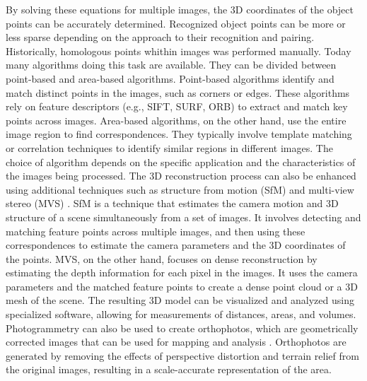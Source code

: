 \documentclass[12pt,a4paper,oneside]{report}
\begin{document}
By solving these equations for multiple images, the 3D coordinates of the object 
points can be accurately determined.
Recognized object points can be more or less sparse depending on the approach to 
their recognition and pairing. 
Historically, homologous points whithin images was
performed manually. Today many algorithms doing this task are available. 
They can be divided between point-based and area-based algorithms.
Point-based algorithms identify and match distinct points in the images, such as
corners or edges. These algorithms rely on feature descriptors (e.g., SIFT, SURF, ORB)
\cite{loweDistinctiveImageFeatures2004,baySpeededUpRobustFeatures2008,rubleeORBEfficientAlternative2011}
to extract and match key points across images. Area-based algorithms, on the other hand,
use the entire image region to find correspondences. They typically involve
template matching or correlation techniques to identify similar regions in different images.
The choice of algorithm depends on the specific application and the characteristics
of the images being processed.
The 3D reconstruction process can also be enhanced using additional techniques such as
structure from motion (SfM) and multi-view stereo (MVS)
\cite{westobyStructurefromMotionPhotogrammetryLowcost2012,seitzComparisonEvaluationMultiView2006}. 
SfM is a technique that
estimates the camera motion and 3D structure of a scene simultaneously from a
set of images. It involves detecting and matching feature points across multiple images,
and then using these correspondences to estimate the camera parameters and the 3D
coordinates of the points. MVS, on the other hand, focuses on dense reconstruction
by estimating the depth information for each pixel in the images. It uses the camera
parameters and the matched feature points to create a dense point cloud or a 3D mesh
of the scene.
The resulting 3D model can be visualized and analyzed using specialized software,
allowing for measurements of distances, areas, and volumes. Photogrammetry can also
be used to create orthophotos, which are geometrically corrected images that can be
used for mapping and analysis
\cite{mikhailIntroductionModernPhotogrammetry2001,paineAerialPhotographyImage2012}. 
Orthophotos are generated by removing the effects of
perspective distortion and terrain relief from the original images, resulting in a
scale-accurate representation of the area.
\end{document}
